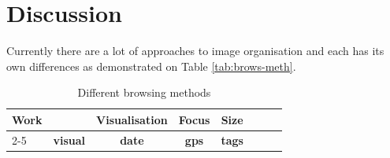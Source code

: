 
\section{Discussion} %
\label{sub:discussion}


Currently there are a lot of approaches to image organisation and each has its own differences as demonstrated on Table \ref{tab:brows-meth}.

\begin{table}[ht]
\caption{Different browsing methods}
 \begin{tabular}{|l|>{\centering}p{2.6cm}|c|c|c|>{\centering}p{2.1cm}|>{\centering}p{2.8cm}|r|}
  \hline
\multirow{2}{*}{\textbf{Work}} & \multicolumn{4}{c|}{\textbf{Organisation}} & \multirow{2}{*}{\textbf{Visualisation}} & \multirow{2}{*}{\textbf{Focus}} & \multirow{2}{*}{\textbf{Size}} \\
\cline{2-5}
	& \textbf{visual} & \textbf{date} & \textbf{gps} & \textbf{tags} & & & \\


\end{tabular}
\end{table}
